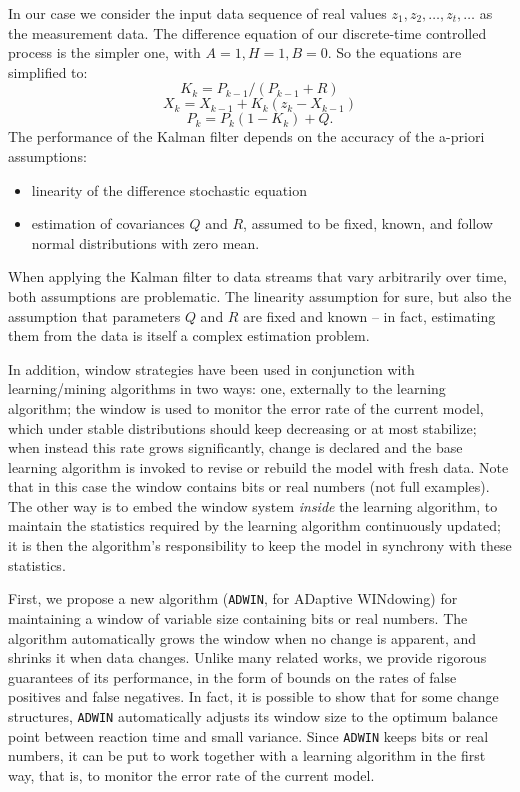 In our case we consider the input data sequence of real values $z_1, z_2, \ldots, z_t, \ldots$ 
as the measurement data. The difference equation of our discrete-time controlled process is the simpler one, 
with $A=1, H=1, B=0$. So the equations are simplified to:
%
$$K_k= P_{k-1}/(P_{k-1}+R)$$
$$X_k=X_{k-1}+ K_k(z_k -X_{k-1})$$
$$P_k=P_k(1-K_k)+Q.$$
%
The performance of the Kalman filter depends on the accuracy of the a-priori assumptions:
\begin{itemize}
\item linearity of the difference stochastic equation%
\item estimation of covariances $Q$ and $R$, assumed to be fixed, known, 
      and follow normal distributions with zero mean.
\end{itemize}  
%
When applying the Kalman filter to data streams that vary arbitrarily over time, both
assumptions are problematic. The linearity assumption for sure, but also the assumption
that parameters $Q$ and $R$ are fixed and known -- in fact, estimating them from the data
is itself a complex estimation problem. 

\ENDOMIT

\label{Ssoestim}






\BEGINOMIT
In addition, window strategies have been used in conjunction
with learning/mining algorithms in two ways: one,
externally to the learning algorithm; the window is used
to monitor the error rate of the current model, which under
stable distributions should keep decreasing or at most stabilize;
when instead this rate grows significantly, change is declared and
the base learning algorithm is invoked to revise or rebuild the
model with fresh data. Note that in this case the window
contains bits or real numbers (not full examples).
The other way is to embed the window system {\em inside} the learning
algorithm, to maintain the statistics required by the learning
algorithm continuously updated; it is then the algorithm's responsibility
to keep the model in synchrony with these statistics. 

First, we propose a new algorithm ({\tt ADWIN}, for ADaptive
WINdowing)
for maintaining a window of variable size containing bits or real numbers.
The algorithm automatically grows the window when no change is apparent,
and shrinks it when data changes.
Unlike many related works, we provide rigorous guarantees of
its performance, in the form of bounds on the rates of false positives
and false negatives.
In fact, it is possible to show that for some change structures, {\tt ADWIN}
automatically adjusts its window size to the optimum balance point
between reaction time and small variance.
Since {\tt ADWIN} keeps bits or real numbers, it can be put to work
together with a learning algorithm in the first way, that is,
to monitor the error rate of the current model.

